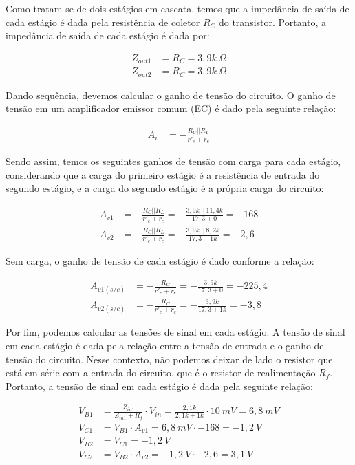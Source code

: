 Como tratam-se de dois estágios em cascata, temos que a impedância de saída de cada estágio é dada pela resistência de coletor $R_C$ do transistor. Portanto, a impedância de saída de cada estágio é dada por:

\begin{align}
    Z_{out1} &= R_C = 3,9k~\Omega \\
    Z_{out2} &= R_C = 3,9k~\Omega
\end{align}

Dando sequência, devemos calcular o ganho de tensão do circuito. O ganho de tensão em um amplificador emissor comum (EC) é dado pela seguinte relação:

\begin{align}
    A_v &= - \frac{R_C || R_L}{r'_e + r_e}
\end{align}

Sendo assim, temos os seguintes ganhos de tensão com carga para cada estágio, considerando que a carga do primeiro estágio é a resistência de entrada do segundo estágio, e a carga do segundo estágio é a própria carga do circuito:

\begin{align}
    A_{v1} &= - \frac{R_C || R_L}{r'_e + r_e} = - \frac{3,9k~||~11,4k}{17,3 + 0} = - 168 \\
    A_{v2} &= - \frac{R_C || R_L}{r'_e + r_e} = - \frac{3,9k~||~8,2k}{17,3 + 1k} = - 2,6
\end{align}

Sem carga, o ganho de tensão de cada estágio é dado conforme a relação:

\begin{align}
    A_{v1(s/c)} &= - \frac{R_C}{r'_e + r_e} = - \frac{3,9k}{17,3 + 0} = - 225,4\\
    A_{v2(s/c)} &= - \frac{R_C}{r'_e + r_e} = - \frac{3,9k}{17,3 + 1k} = - 3,8
\end{align}

Por fim, podemos calcular as tensões de sinal em cada estágio. A tensão de sinal em cada estágio é dada pela relação entre a tensão de entrada e o ganho de tensão do circuito. Nesse contexto, não podemos deixar de lado o resistor que está em série com a entrada do circuito, que é o resistor de realimentação $R_f$. Portanto, a tensão de sinal em cada estágio é dada pela seguinte relação:

\begin{align}
    V_{B1} &= \frac{Z_{in1}}{Z_{in1} + R_f} \cdot V_{in} = \frac{2,1k}{2,1k + 1k} \cdot 10~mV = 6,8~mV \\
    V_{C1} &= V_{B1} \cdot A_{v1} = 6,8~mV \cdot - 168 = -1,2~V \\
    V_{B2} &= V_{C1} = -1,2~V \\
    V_{C2} &= V_{B2} \cdot A_{v2} = -1,2~V \cdot - 2,6 = 3,1~V
\end{align}

